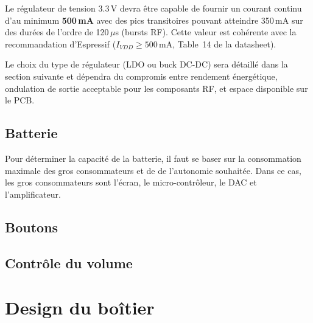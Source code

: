 Le régulateur de tension 3.3\,V devra être capable de fournir un courant continu d'au minimum \textbf{500\,mA} avec des pics transitoires pouvant atteindre 350\,mA sur des durées de l'ordre de 120\,$\mu$s (bursts RF). Cette valeur est cohérente avec la recommandation d'Espressif ($I_{VDD} \geq 500$\,mA, Table~14 de la datasheet).

Le choix du type de régulateur (LDO ou buck DC-DC) sera détaillé dans la section suivante et dépendra du compromis entre rendement énergétique, ondulation de sortie acceptable pour les composants RF, et espace disponible sur le PCB.

\clearpage
\subsection{Batterie}
Pour déterminer la capacité de la batterie, il faut se baser sur la consommation maximale des gros consommateurs et de de l'autonomie souhaitée. Dans ce cas, les gros consommateurs sont l'écran, le micro-contrôleur, le DAC et l'amplificateur.



\subsection{Boutons}

\subsection{Contrôle du volume}

\clearpage
\section{Design du boîtier}
